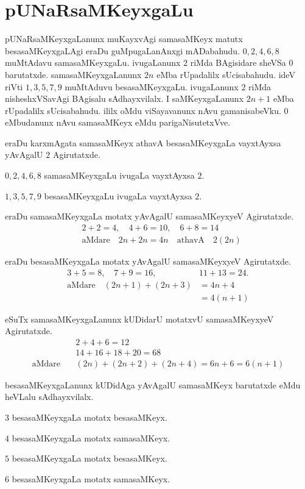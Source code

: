 \chapter{pUNaRsaMKeyxgaLu}

pUNaRsaMKeyxgaLanunx muKayxvAgi samasaMKeyx matutx besasaMKeyxgaLAgi eraDu guMpu\-gaLanAnxgi mADabahudu. $0,2,4,6,8$ muMtAdavu samasaMKeyxgaLu. ivugaLanunx \-$2$ riMda BAgisidare sheVSa $0$ barutatxde. samasaMKeyxgaLanunx $2n$ eMba rUpadalilx sUcisa\-bahudu. ideV riVti $1,3,5,7,9$ muMtAduvu besasaMKeyxgaLu. ivugaLanunx $2$ riMda nisheshxVSavAgi BAgisalu sAdhayxvilalx. I saMKeyxgaLanunx $2n+1$ eMba rUpadalilx sUcisabahudu. ililx oMdu viSayavanunx nAvu gamanisabeVku. $0$ eMbudanunx nAvu samasaMKeyx eMdu parigaNisutetxVve.

eraDu karxmAgata samasaMKeyx athavA besasaMKeyxgaLa vayxtAyxsa yAvAgalU $2$ \-Agirutatxde.

$0,2,4,6,8$ samasaMKeyxgaLu ivugaLa vayxtAyxsa $2$. 

$1,3,5,7,9$ besasaMKeyxgaLu ivugaLa vayxtAyxsa $2$. 

eraDu samasaMKeyxgaLa motatx yAvAgalU samasaMKeyxyeV Agirutatxde.
\begin{align*}
&2+2 =4, \quad 4+6=10, \quad 6+8=14\\
&\text{aMdare}\quad 2n+2n =4n\quad \text{athavA}\quad 2(2n)
\end{align*}

eraDu besasaMKeyxgaLa motatx yAvAgalU samasaMKeyxyeV Agirutatxde.
\begin{align*}
3+5=8,\quad 7+9=16,\quad &11+13 =24.\\
\text{aMdare}\quad (2n+1)+(2n+3)&= 4n+4\\
 &= 4(n+1)
\end{align*}

eSuTx samasaMKeyxgaLanunx kUDidarU motatxvU samasaMKeyxyeV Agirutatxde.
\begin{align*}
&2+4+6=12\\
&14+16+18+20=68\\
\text{aMdare}\quad &(2n)+(2n+2)+(2n+4)=6n+6=6(n+1)
\end{align*}

besasaMKeyxgaLanunx kUDidAga yAvAgalU samasaMKeyx barutatxde eMdu heVLalu sAdhayxvilalx.
\begin{description}
\item $3$ besasaMKeyxgaLa motatx besasaMKeyx.
\item $4$ besasaMKeyxgaLa motatx samasaMKeyx.
\item $5$ besasaMKeyxgaLa motatx besasaMKeyx.
\item $6$ besasaMKeyxgaLa motatx samasaMKeyx.
\end{description}

